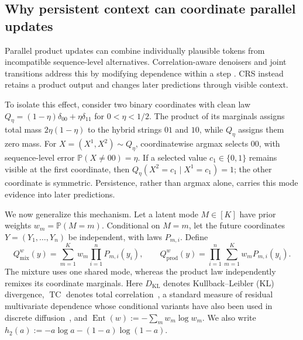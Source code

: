 \documentclass{article}
\newcommand{\KL}{D_{\mathrm{KL}}}
\newcommand{\TC}{\operatorname{TC}}
\newcommand{\Ent}{\operatorname{Ent}}
\newcommand{\1}{\mathbf 1}
\newcommand{\CRS}{\textsc{CRS}}
\theoremstyle{definition}
\begin{document}
\subsection{Why persistent context can coordinate parallel updates}
\label{sec:theory}

Parallel product updates can combine individually plausible tokens from
incompatible sequence-level alternatives. Correlation-aware denoisers and
joint transitions address this by modifying dependence within a step
\citep{hayakawa2025distillation,xu2024edlm,li2026codd}. \CRS{} instead retains
a product output and changes later predictions through visible context.

To isolate this effect, consider two binary coordinates with clean law
$Q_\eta=(1-\eta)\delta_{00}+\eta\delta_{11}$ for $0<\eta<1/2$.
The product of its marginals assigns total mass $2\eta(1-\eta)$ to the hybrid
strings $01$ and $10$, while $Q_\eta$ assigns them zero mass. For
$X=(X^1,X^2)\sim Q_\eta$, coordinatewise argmax selects $00$, with
sequence-level error $\mathbb P(X\ne00)=\eta$. If a selected value
$c_1\in\{0,1\}$ remains visible at the first coordinate, then
$Q_\eta(X^2=c_1\mid X^1=c_1)=1$; the other coordinate is symmetric.
Persistence, rather than argmax alone, carries this mode evidence into later
predictions.

We now generalize this mechanism. Let a latent mode
$M\in[K]$ have prior weights $w_m=\mathbb P(M=m)$. Conditional on $M=m$,
let the future coordinates $Y=(Y_1,\ldots,Y_n)$ be independent, with laws
$P_{m,i}$. Define
\begin{equation}
 Q_{\mathrm{mix}}^w(y)=\sum_{m=1}^K w_m\prod_{i=1}^nP_{m,i}(y_i),
 \qquad
 Q_{\mathrm{prod}}^w(y)=\prod_{i=1}^n\sum_{m=1}^K w_mP_{m,i}(y_i).
 \label{eq:shared-mode-laws}
\end{equation}
The mixture uses one shared mode, whereas the product law independently
remixes its coordinate marginals. Here $\KL$ denotes Kullback--Leibler (KL)
divergence, $\TC$ denotes total correlation~\citep{watanabe1960information}, a
standard measure of residual multivariate dependence whose conditional variants
have also been used in discrete diffusion~\citep{yoo2025redi}, and
$\Ent(w):=-\sum_m w_m\log w_m$. We also write
$h_2(a):=-a\log a-(1-a)\log(1-a)$.
\end{document}
